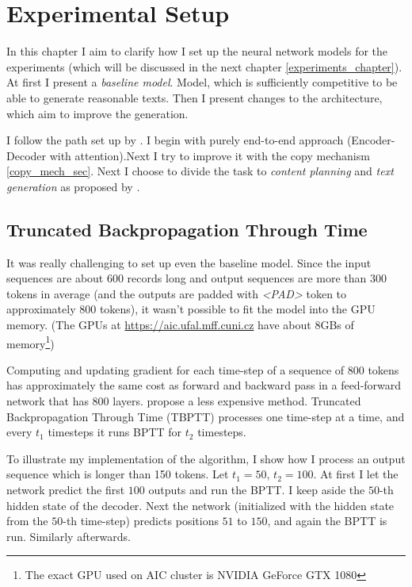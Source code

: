 \chapter{Experimental Setup} \label{model_chapter}
In this chapter I aim to clarify how I set up the neural network models for the experiments (which will be discussed in the next chapter \ref{experiments_chapter}). At first I present a \emph{baseline model}. Model, which is sufficiently competitive to be able to generate reasonable texts. Then I present changes to the architecture, which aim to improve the generation.

I follow the path set up by \citep{wiseman2017}. I begin with purely end-to-end approach (Encoder-Decoder with attention).Next I try to improve it with the copy mechanism \ref{copy_mech_sec}. Next I choose to divide the task to \emph{content planning} and \emph{text generation} as proposed by \citep{puduppully2019datatotext}.

\section{Truncated Backpropagation Through Time} \label{truncated_backprop_subsubsection}

It was really challenging to set up even the baseline model. Since the input sequences are about 600 records long and output sequences are more than 300 tokens in average (and the outputs are padded with \emph{\textless PAD\textgreater} token to approximately 800 tokens), it wasn't possible to fit the model into the GPU memory. (The GPUs at \url{https://aic.ufal.mff.cuni.cz} have about 8GBs of memory\footnote{The exact GPU used on AIC cluster is NVIDIA GeForce GTX 1080})

Computing and updating gradient for each time-step of a sequence of 800 tokens has approximately the same cost as forward and backward pass in a feed-forward network that has 800 layers. \citep{williamsTBPTT} propose a less expensive method. Truncated Backpropagation Through Time (TBPTT) processes one time-step at a time, and every $t_1$ timesteps it runs BPTT for $t_2$ timesteps.

To illustrate my implementation of the algorithm, I show how I process an output sequence which is longer than 150 tokens. Let $t_1 = 50$, $t_2 = 100$. At first I let the network predict the first $100$ outputs and run the BPTT. I keep aside the $50$-th hidden state of the decoder. Next the network (initialized with the hidden state from the $50$-th time-step) predicts positions $51$ to $150$, and again the BPTT is run. Similarly afterwards.

